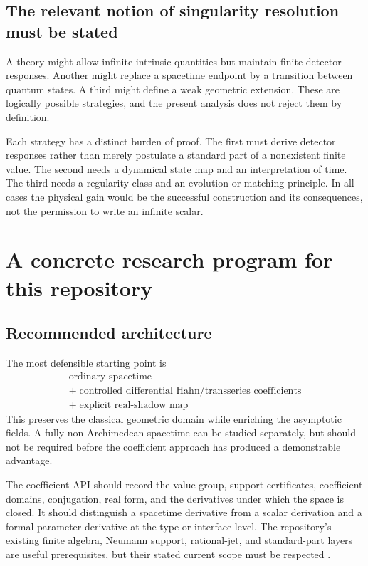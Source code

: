 \documentclass[11pt,a4paper]{article}
\numberwithin{equation}{section}
\theoremstyle{definition}
\theoremstyle{remark}
\begin{document}
\subsection{The relevant notion of singularity resolution must be stated}
A theory might allow infinite intrinsic quantities but maintain finite detector
responses. Another might replace a spacetime endpoint by a transition between
quantum states. A third might define a weak geometric extension. These are
logically possible strategies, and the present analysis does not reject them
by definition.

Each strategy has a distinct burden of proof. The first must derive detector
responses rather than merely postulate a standard part of a nonexistent finite
value. The second needs a dynamical state map and an interpretation of time.
The third needs a regularity class and an evolution or matching principle.
In all cases the physical gain would be the successful construction and its
consequences, not the permission to write an infinite scalar.

\section{A concrete research program for this repository}\label{sec:program}

\subsection{Recommended architecture}
The most defensible starting point is
\begin{equation}\label{eq:architecture}
\boxed{\begin{gathered}
\text{ordinary spacetime}\\
+\;\text{controlled differential Hahn/transseries coefficients}\\
+\;\text{explicit real-shadow map}
\end{gathered}}
\end{equation}
This preserves the classical geometric domain while enriching the asymptotic
fields. A fully non-Archimedean spacetime can be studied separately, but should
not be required before the coefficient approach has produced a demonstrable
advantage.

The coefficient API should record the value group, support certificates,
coefficient domains, conjugation, real form, and the derivatives under which
the space is closed. It should distinguish a spacetime derivative from a scalar
derivation and a formal parameter derivative at the type or interface level.
The repository's existing finite algebra, Neumann support, rational-jet, and
standard-part layers are useful prerequisites, but their stated current scope
must be respected \cite{RepoRoot}.
\end{document}
